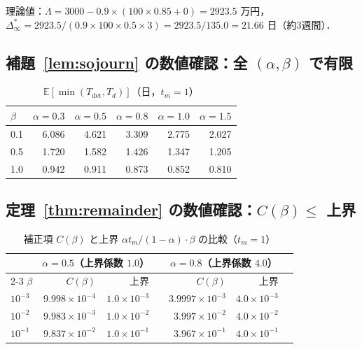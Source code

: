 \documentclass[12pt,a4paper]{article}
\theoremstyle{plain}
\theoremstyle{definition}
\theoremstyle{remark}
\newcommand{\E}{\mathbb{E}}
\newcommand{\Tdet}{T_{\mathrm{det}}}
\newcommand{\Dinf}{\Delta^{*}_{\infty}}
\newcommand{\La}{\Lambda}   %
\begin{document}
理論値：$\La=3000-0.9\times(100\times0.85+0)=2923.5$ 万円，
$\Dinf=2923.5/(0.9\times100\times0.5\times3)=2923.5/135.0=21.66$ 日（約3週間）．

\subsection{補題~\ref{lem:sojourn} の数値確認：全 $(\alpha,\beta)$ で有限}

\begin{table}[h]
\centering
\caption{$\E[\min(\Tdet,T_d)]$（日，$t_m=1$）}
\label{tab:sojourn}
\begin{tabular}{@{}lrrrrr@{}}
\toprule
$\beta$ & $\alpha=0.3$ & $\alpha=0.5$ & $\alpha=0.8$ & $\alpha=1.0$ & $\alpha=1.5$ \\
\midrule
0.1 & 6.086 & 4.621 & 3.309 & 2.775 & 2.027 \\
0.5 & 1.720 & 1.582 & 1.426 & 1.347 & 1.205 \\
1.0 & 0.942 & 0.911 & 0.873 & 0.852 & 0.810 \\
\bottomrule
\end{tabular}
\end{table}

\subsection{定理~\ref{thm:remainder} の数値確認：$C(\beta)\le$ 上界}

\begin{table}[h]
\centering
\caption{補正項 $C(\beta)$ と上界 $\alpha t_m/(1-\alpha)\cdot\beta$ の比較（$t_m=1$）}
\label{tab:remainder}
\begin{tabular}{@{}lrrlrrl@{}}
\toprule
& \multicolumn{2}{c}{$\alpha=0.5$（上界係数 $1.0$）} &&
\multicolumn{2}{c}{$\alpha=0.8$（上界係数 $4.0$）}\\
\cmidrule{2-3}\cmidrule{5-6}
$\beta$ & $C(\beta)$ & 上界 && $C(\beta)$ & 上界 \\
\midrule
$10^{-3}$ & $9.998\times10^{-4}$ & $1.0\times10^{-3}$ &&
$3.9997\times10^{-3}$ & $4.0\times10^{-3}$ \\
$10^{-2}$ & $9.983\times10^{-3}$ & $1.0\times10^{-2}$ &&
$3.997\times10^{-2}$ & $4.0\times10^{-2}$ \\
$10^{-1}$ & $9.837\times10^{-2}$ & $1.0\times10^{-1}$ &&
$3.967\times10^{-1}$ & $4.0\times10^{-1}$ \\
\bottomrule
\end{tabular}
\end{table}
\end{document}
